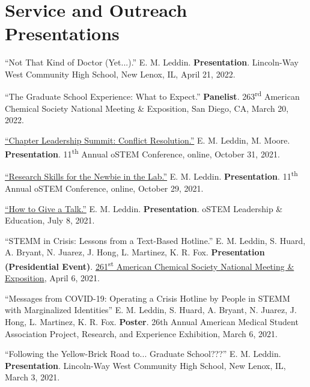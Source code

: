 \documentclass[letterpaper,11pt]{article}
\begin{document}
\section{Service and Outreach Presentations}
\begin{etaremune}[start=20]
\item \textnormal{``Not That Kind of Doctor (Yet...).'' E. M. Leddin. \textbf{Presentation}. Lincoln-Way West Community High School, New Lenox, IL, April 21, 2022.}
  \item \textnormal{``The Graduate School Experience: What to Expect.'' \textbf{Panelist}. 263\textsuperscript{rd} American Chemical Society National Meeting \& Exposition, San Diego, CA, March 20, 2022.}
  \item \textnormal{\href{http://bit.ly/2021-oSTEM-CLS}{``Chapter Leadership Summit: Conflict Resolution.''} E. M. Leddin, M. Moore. \textbf{Presentation}. 11\textsuperscript{th} Annual oSTEM Conference, online, October 31, 2021.}
  \item \textnormal{\href{http://bit.ly/2021-oSTEM-RSNL}{``Research Skills for the Newbie in the Lab.''} E. M. Leddin. \textbf{Presentation}. 11\textsuperscript{th} Annual oSTEM Conference, online, October 29, 2021.}
  \item \textnormal{\href{https://bit.ly/2021-LE-Give-Talk
}{``How to Give a Talk.''} E. M. Leddin. \textbf{Presentation}. oSTEM Leadership \& Education, July 8, 2021.}
  \item \textnormal{``STEMM in Crisis: Lessons from a Text-Based Hotline.'' E. M. Leddin, S. Huard, A. Bryant, N. Juarez, J. Hong, L. Martinez, K. R. Fox. \textbf{Presentation (Presidential Event)}. \href{https://bit.ly/2021-THRIVE-ACS}{261\textsuperscript{st} American Chemical Society National Meeting \& Exposition}, April 6, 2021.}
  \item \textnormal{``Messages from COVID-19: Operating a Crisis Hotline by People in STEMM with Marginalized Identities'' E. M. Leddin, S. Huard, A. Bryant, N. Juarez, J. Hong, L. Martinez, K. R. Fox. \textbf{Poster}. 26th Annual American Medical Student Association Project, Research, and Experience Exhibition, March 6, 2021.}
  \item \textnormal{``Following the Yellow-Brick Road to... Graduate School???'' E. M. Leddin. \textbf{Presentation}. Lincoln-Way West Community High School, New Lenox, IL, March 3, 2021.}

\end{etaremune}
\newpage
\end{document}
